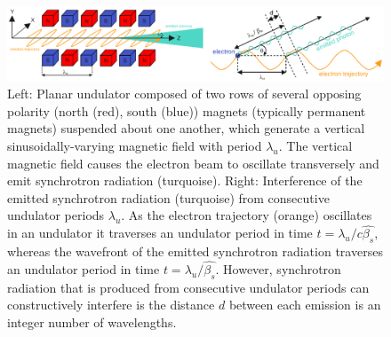 \documentclass[../main.tex]{subfiles}
\begin{document}
\begin{figure}[!h]
\centering
\includegraphics[width=\textwidth]{Figures/Introduction/undulator_and_interference.pdf}
\caption{Left: Planar undulator composed of two rows of several opposing polarity (north (red), south (blue)) magnets (typically permanent magnets) suspended about one another, which generate a vertical sinusoidally-varying magnetic field with period $\lambda_{u}$. The vertical magnetic field causes the electron beam to oscillate transversely and emit synchrotron radiation (turquoise). Right: Interference of the emitted synchrotron radiation (turquoise) from consecutive undulator periods $\lambda_{u}$. As the electron trajectory (orange) oscillates in an undulator it traverses an undulator period in time $t= \lambda_{u}/c\hat{\beta_{s}}$, whereas the wavefront of the emitted synchrotron radiation traverses an undulator period in time $t=\lambda_{u}/\hat{\beta_{s}}$. However, synchrotron radiation that is produced from consecutive undulator periods can constructively interfere is the distance $d$ between each emission is an integer number of wavelengths.}
\label{fig:planar_undulator_diagram}
\end{figure}
\end{document}
